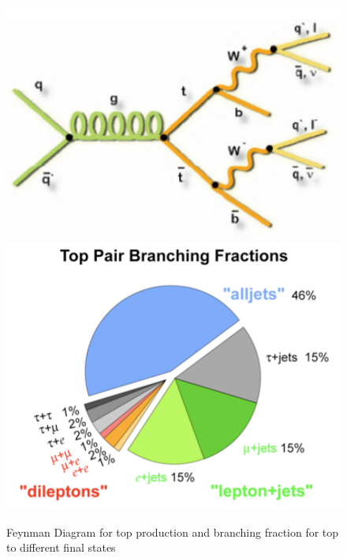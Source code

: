 \begin{figure}[h]
\centering\includegraphics[scale=0.3]{./protonprotoncollisions/Pictures/fig11.pdf}
\centering\includegraphics[scale=0.3]{./protonprotoncollisions/Pictures/fig12.pdf}
\caption{Feynman Diagram for top production and branching fraction for top to different final states}
\label{fig:topfeyn}
\end{figure}

